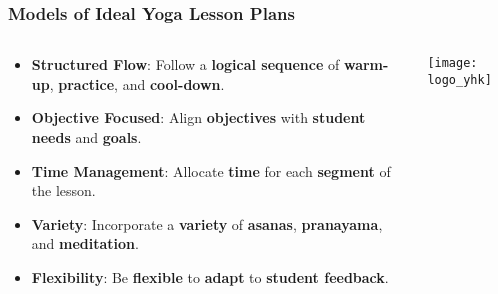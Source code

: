 \begin{frame}[fragile]\frametitle{Models of Ideal Yoga Lesson Plans}
\begin{columns}
    \begin{column}[T]{0.5\linewidth}
      \begin{itemize}
        \item \textbf{Structured Flow}: Follow a \textbf{logical sequence} of \textbf{warm-up}, \textbf{practice}, and \textbf{cool-down}.
        \item \textbf{Objective Focused}: Align \textbf{objectives} with \textbf{student needs} and \textbf{goals}.
        \item \textbf{Time Management}: Allocate \textbf{time} for each \textbf{segment} of the lesson.
        \item \textbf{Variety}: Incorporate a \textbf{variety} of \textbf{asanas}, \textbf{pranayama}, and \textbf{meditation}.
        \item \textbf{Flexibility}: Be \textbf{flexible} to \textbf{adapt} to \textbf{student feedback}.
      \end{itemize}
    \end{column}
    \begin{column}[T]{0.5\linewidth}
        \begin{center}
        \texttt{[image: logo\_yhk]}
        \end{center}	
    \end{column}
\end{columns}
\end{frame}

